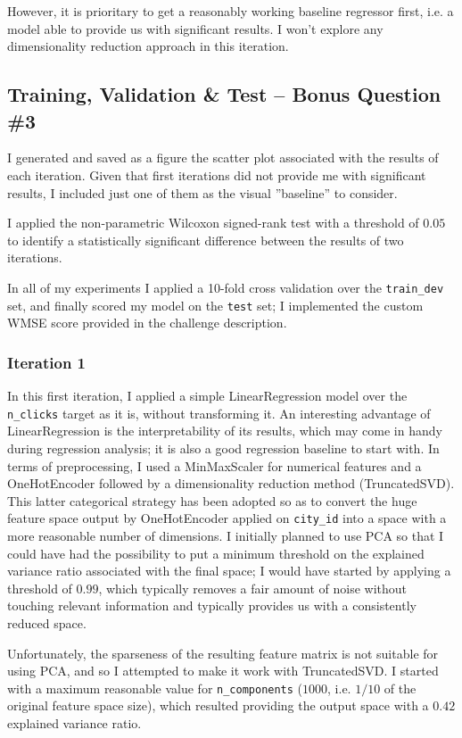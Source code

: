 \documentclass[preprint,12pt,3p]{elsarticle}
\begin{document}
However, it is prioritary to get a reasonably working baseline regressor first, i.e. a model able to provide us with significant results.
I won't explore any dimensionality reduction approach in this iteration.

\subsection{Training, Validation \& Test -- Bonus Question \#3}
I generated and saved as a figure the scatter plot associated with the results of each iteration. Given that first iterations did not provide me with significant results, I included just one of them as the visual ''baseline'' to consider.

I applied the non-parametric Wilcoxon signed-rank test with a threshold of $0.05$ to identify a statistically significant difference between the results of two iterations.

In all of my experiments I applied a 10-fold cross validation over the \verb|train_dev| set, and finally scored my model on the \verb|test| set; I implemented the custom WMSE score provided in the challenge description.

\subsubsection{Iteration 1}
In this first iteration, I applied a simple LinearRegression model over the \verb|n_clicks| target as it is, without transforming it. An interesting advantage of LinearRegression is the interpretability of its results, which may come in handy during regression analysis; it is also a good regression baseline to start with. In terms of preprocessing, I used a MinMaxScaler for numerical features and a OneHotEncoder followed by a dimensionality reduction method (TruncatedSVD). This latter categorical strategy has been adopted so as to convert the huge feature space output by OneHotEncoder applied on \verb|city_id| into a space with a more reasonable number of dimensions. I initially planned to use PCA so that I could have had the possibility to put a minimum threshold on the explained variance ratio associated with the final space; I would have started by applying a threshold of $0.99$, which typically removes a fair amount of noise without touching relevant information and typically provides us with a consistently reduced space.

Unfortunately, the sparseness of the resulting feature matrix is not suitable for using PCA, and so I attempted to make it work with TruncatedSVD. I started with a maximum reasonable value for \verb|n_components| ($1000$, i.e. $1/10$ of the original feature space size), which resulted providing the output space with a $0.42$ explained variance ratio.
\end{document}
